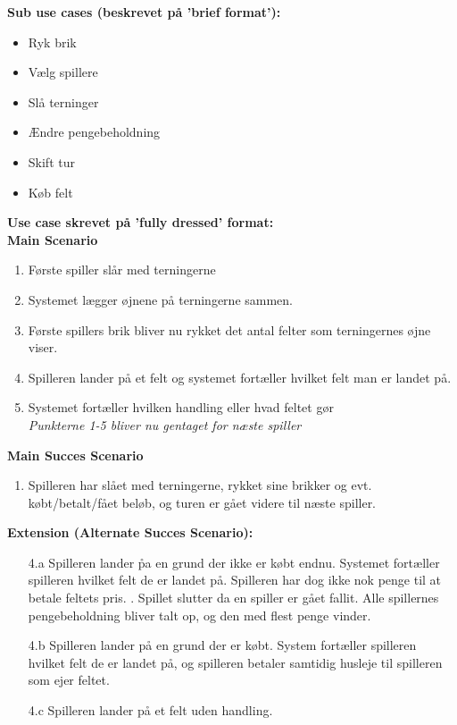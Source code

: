 \documentclass{article}
\begin{document}
\textbf{Sub use cases (beskrevet på 'brief format'):}
\begin{itemize}
    \item Ryk brik
    \item Vælg spillere
    \item Slå terninger
    \item Ændre pengebeholdning
    \item Skift tur
    \item Køb felt
\end{itemize}

\textbf{Use case skrevet på 'fully dressed' format:}\\


\textbf{Main Scenario}
\begin{enumerate}
\itemsep-0.5em
    \item Første spiller slår med terningerne
    \item Systemet lægger øjnene på terningerne sammen.
    \item Første spillers brik bliver nu rykket det antal felter som terningernes øjne viser.
    \item Spilleren lander på et felt og systemet fortæller hvilket felt man er landet på.
    \item Systemet fortæller hvilken handling eller hvad feltet gør\\
    \textit{Punkterne 1-5 bliver nu gentaget for næste spiller}
\end{enumerate}

\textbf{Main Succes Scenario}
\begin{enumerate}
\itemsep-0.5em
    \item Spilleren har slået med terningerne, rykket sine brikker og evt. købt/betalt/fået beløb, og turen er gået videre til næste spiller. 
\end{enumerate}
\textbf{Extension (Alternate Succes Scenario): }
\begin{enumerate}
    \item [4.a] Spilleren lander p̊a en grund der ikke er købt endnu. Systemet fortæller spilleren hvilket felt de er landet på. Spilleren har dog ikke nok penge til at betale feltets pris.
    . Spillet slutter da en spiller er gået fallit. Alle spillernes pengebeholdning bliver talt op, og den med flest penge vinder.
    \item [4.b] Spilleren lander på en grund der er købt. System fortæller spilleren hvilket felt de er landet på, og spilleren betaler samtidig husleje til spilleren som ejer feltet.
    \item [4.c] Spilleren lander på et felt uden handling.
\end{enumerate}
\end{document}
